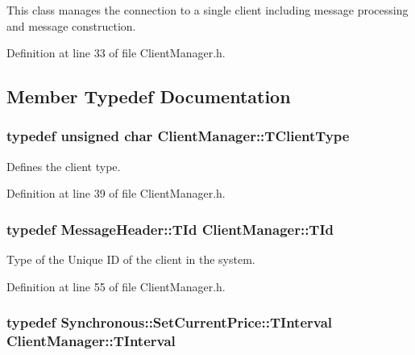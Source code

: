 This class manages the connection to a single client including message processing and message construction. 

Definition at line 33 of file Client\-Manager.\-h.



\subsection{Member Typedef Documentation}
\hypertarget{class_client_manager_a223aecacabe855f08e4675b12403dfa4}{
\subsubsection[{T\-Client\-Type}]{\setlength{\rightskip}{0pt plus 5cm}typedef unsigned char {\bf Client\-Manager\-::\-T\-Client\-Type}\hspace{0.3cm}{\ttfamily [private]}}}\label{class_client_manager_a223aecacabe855f08e4675b12403dfa4}


Defines the client type. 



Definition at line 39 of file Client\-Manager.\-h.

\hypertarget{class_client_manager_a531e5e7eb779e8ce3c47b8eabd8e9b17}{
\subsubsection[{T\-Id}]{\setlength{\rightskip}{0pt plus 5cm}typedef {\bf Message\-Header\-::\-T\-Id} {\bf Client\-Manager\-::\-T\-Id}\hspace{0.3cm}{\ttfamily [private]}}}\label{class_client_manager_a531e5e7eb779e8ce3c47b8eabd8e9b17}


Type of the Unique I\-D of the client in the system. 



Definition at line 55 of file Client\-Manager.\-h.

\hypertarget{class_client_manager_a429cc3229a8121c83655945ebaec18a6}{
\subsubsection[{T\-Interval}]{\setlength{\rightskip}{0pt plus 5cm}typedef {\bf Synchronous\-::\-Set\-Current\-Price\-::\-T\-Interval} {\bf Client\-Manager\-::\-T\-Interval}}}\label{class_client_manager_a429cc3229a8121c83655945ebaec18a6}


